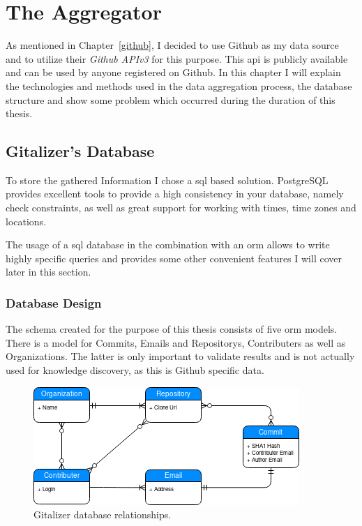 \section{The Aggregator}\label{aggregator}
As mentioned in Chapter~\ref{github}, I decided to use Github as my data source and to utilize their \emph{Github APIv3} for this purpose.
This \ac{api} is publicly available and can be used by anyone registered on Github.
In this chapter I will explain the technologies and methods used in the data aggregation process, the database structure and show some problem which occurred during the duration of this thesis.


\subsection{Gitalizer's Database}\label{data-structure}
To store the gathered Information I chose a \ac{sql} based solution.
PostgreSQL provides excellent tools to provide a high consistency in your database, namely check constraints, as well as great support for working with times, time zones and locations.

The usage of a \ac{sql} database in the combination with an \ac{orm} allows to write highly specific queries and provides some other convenient features I will cover later in this section.

\subsubsection{Database Design}
The schema created for the purpose of this thesis consists of five \ac{orm} models.
There is a model for Commits, Emails and Repositorys, Contributers as well as Organizations.
The latter is only important to validate results and is not actually used for knowledge discovery, as this is Github specific data.

\begin{figure}[H]
\includegraphics[scale=0.27]{./graphs/gitalizer-data-structure}
\centering
\caption{Gitalizer database relationships.}\label{fig:gitalizer-relationship}
\end{figure}

